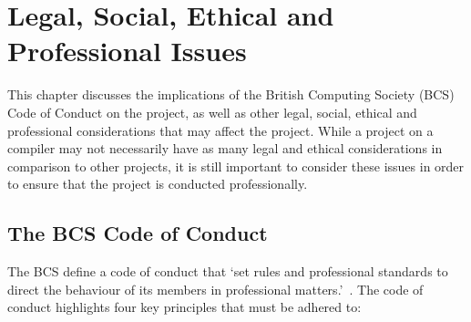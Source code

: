 \chapter{Legal, Social, Ethical and Professional Issues}

This chapter discusses the implications of the British Computing Society (BCS) Code of Conduct on
the project, as well as other legal, social, ethical and professional considerations that may affect
the project. While a project on a compiler may not necessarily have as many legal and ethical
considerations in comparison to other projects, it is still important to consider these issues in
order to ensure that the project is conducted professionally.

\section{The BCS Code of Conduct}

The BCS define a code of conduct that `set rules and professional standards to direct the behaviour
of its members in professional matters.'~\autocite{bcs}. The code of conduct highlights four key
principles that must be adhered to:

